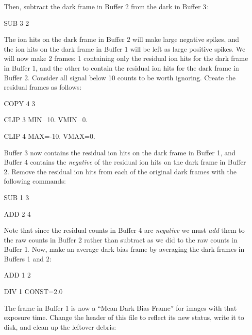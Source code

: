\noindent
Then, subtract the dark frame in Buffer 2 from the dark in Buffer 3:

\begin{command}
      \item SUB 3 2
\end{command}

\noindent
The ion hits on the dark frame in Buffer 2 will make large negative spikes,
and the ion hits on the dark frame in Buffer 1 will be left as large positive
spikes.  We will now make 2 frames:  1 containing only the residual ion hits
for the dark frame in Buffer 1, and the other to contain the residual ion hits
for the dark frame in Buffer 2. Consider all signal below 10 counts to be
worth ignoring.  Create the residual frames as follows: 

\begin{command}
      \item COPY 4 3
      \item CLIP 3 MIN=10. VMIN=0.
      \item CLIP 4 MAX=-10. VMAX=0.
\end{command}

\noindent
Buffer 3 now contains the residual ion hits on the dark frame in Buffer 1, and
Buffer 4 contains the {\it negative} of the residual ion hits on the dark
frame in Buffer 2.  Remove the residual ion hits from each of the original
dark frames with the following commands: 

\begin{command}
      \item SUB 1 3
      \item ADD 2 4
\end{command}

\noindent
Note that since the residual counts in Buffer 4 are {\it negative} we must
{\it add} them to the raw counts in Buffer 2 rather than subtract as we did to
the raw counts in Buffer 1.  Now, make an average dark bias frame by averaging
the dark frames in Buffers 1 and 2: 

\begin{command}
      \item ADD 1 2
      \item DIV 1 CONST=2.0
\end{command}

\noindent
The frame in Buffer 1 is now a ``Mean Dark Bias Frame'' for images with that
exposure time.  Change the header of this file to reflect its new status,
write it to disk, and clean up the leftover debris: 

